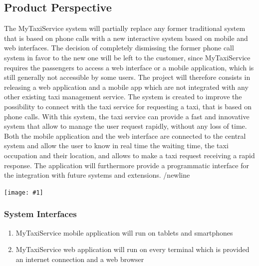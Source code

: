 \documentclass[11pt, a4paper,titlepage]{article}
\newcommand{\productname}{MyTaxiService }
\newcommand{\image}[1]{
	\begin{center}
		\noindent \texttt{[image: \#1]}
	\end{center}
	}
\begin{document}
\subsection{Product Perspective}
The \productname system will partially replace any former traditional system that is based on phone calls with a new interactive system based on mobile and web interfaces. \newline
The decision of completely dismissing the former phone call system in favor to the new one will be left to the customer, since \productname requires the passengers to access a web interface or a mobile application, which is still generally not accessible by some users.
\newline
The project will therefore consists in releasing a web application and a mobile app which are not integrated with any other existing taxi management service.
The system is created to improve the possibility to connect with the taxi service for requesting a taxi, that is based on phone calls.
With this system, the taxi service can provide a fast and innovative system that allow to manage the user request rapidly, without any loss of time.
Both the mobile application and the web interface are connected to the central system and allow the user to know in real time the waiting time, the taxi occupation and their location, and allows to make a taxi request receiving a rapid response.
The application will furthermore provide a programmatic interface for the integration with future systems and extensions.
/newline

	\image{perspective_schema.png}

\pagebreak
\subsubsection{System Interfaces}
	\begin{enumerate}
		\item \productname mobile application will run on tablets and smartphones
		\item \productname web application will run on every terminal which is provided an internet connection and a web browser
	\end{enumerate}
\end{document}
